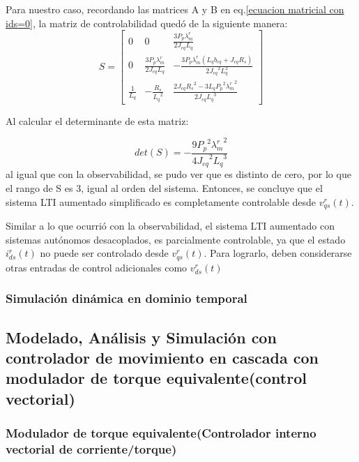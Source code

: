 \documentclass[a4paper, 10pt, onecolumn,journal]{ieeeconf}
\begin{document}
Para nuestro caso, recordando las matrices A y B en eq.\eqref{ecuacion matricial con ids=0}, la matriz de controlabilidad quedó de la siguiente manera:
\begin{equation}
	S=
	\begin{bmatrix}
		0 & 0 & \frac{3 P_p \lambda^r_m}{2 J_{eq} L_q}\\ 
		0 & \frac{3 P_p \lambda^r_m}{2 J_{eq} L_q} & -\frac{3 P_p \lambda^r_m \left(L_q b_{eq} + J_{eq} R_s \right)}{2 {J_{eq}}^2 L_q^2}\\
		\frac{1}{L_q} & -\frac{R_s}{{L_q}^2} & \frac{2 J_{eq} {R_s}^2 - 3 L_{q} {P_p}^2 {\lambda^r_m}^2} {2 J_{eq} {L_q}^3}  
	\end{bmatrix}
	\label{Matriz de controlabilidad del LTI}
\end{equation}

Al calcular el determinante de esta matriz:

\begin{equation}
	det(S)= -\frac{9 {P_p}^2 {\lambda^r_m}^2}{4 {J_{eq}}^2 {{L_q}}^3}
	\label{determinante de Matriz de controlabilidad del LTI}
\end{equation}
al igual que con la observabilidad, se pudo ver que es distinto de cero, por lo que el rango de S es 3, igual al orden del sistema. Entonces, se concluye que el sistema LTI aumentado simplificado es completamente controlable desde $v^r_{qs}(t)$.

Similar a lo que ocurrió con la observabilidad, el sistema LTI aumentado con sistemas autónomos desacoplados, es parcialmente controlable, ya que el estado ${i}^r_{ds}(t) $  no puede ser controlado desde $v^r_{qs}(t)$. Para lograrlo, deben considerarse otras entradas de control adicionales como  $v^r_{ds}(t)$ 


\subsubsection{\textbf{Simulación dinámica en dominio temporal}}

\subsection{\textbf{Modelado, Análisis y Simulación con controlador de movimiento en cascada con modulador de torque equivalente(control vectorial)}}

\subsubsection{\textbf{Modulador de torque equivalente(Controlador interno vectorial de corriente/torque)}}
\end{document}
